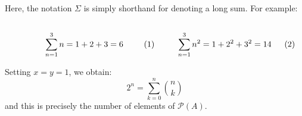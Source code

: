 \begin{example}
\begin{subequations}
            \end{subequations}
            Here, the notation $\Sigma$ is simply shorthand for denoting a long
            sum. For example:
            \par
            \begin{subequations}
                \begin{minipage}[b]{0.49\textwidth}
                    \centering
                    \begin{equation}
                        \sum_{n=1}^{3}n=1+2+3=6
                    \end{equation}
                \end{minipage}
                \hfill
                \begin{minipage}[b]{0.49\textwidth}
                    \centering
                    \begin{equation}
                        \sum_{n=1}^{3}n^{2}=1+2^{2}+3^{2}=14
                    \end{equation}
                \end{minipage}
            \end{subequations}
            \par\vspace{2.5ex}
            Setting $x=y=1$, we obtain:
            \begin{equation}
                2^{n}=\sum_{k=0}^{n}\binom{n}{k}
            \end{equation}
            and this is precisely the number of elements of $\mathcal{P}(A)$.
        \end{example}
